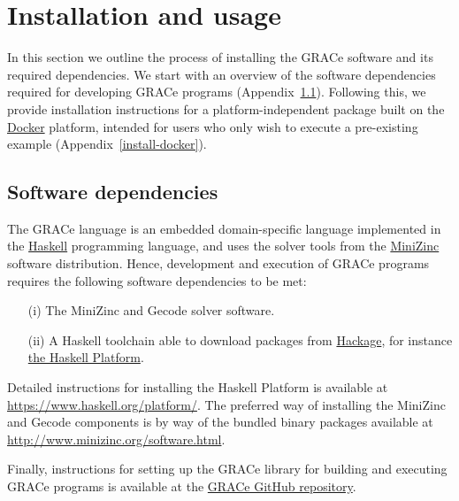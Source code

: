 
\section{Installation and usage}
\label{appendix-install}
%
In this section we outline the process of installing the GRACe software and its
required dependencies. We start with an overview of the software dependencies
required for developing GRACe programs (Appendix~\ref{install-overview}).
Following this, we provide installation instructions for a platform-independent
package built on the \href{https://www.docker.com/}{Docker} platform, intended
for users who only wish to execute a pre-existing example
(Appendix~\ref{install-docker}).


\subsection{Software dependencies}
\label{install-overview}
%
The GRACe language is an embedded domain-specific language implemented in the
\href{https://www.haskell.org/}{Haskell} programming language, and uses the
solver tools from the \href{http://www.minizinc.org/}{MiniZinc} software
distribution. Hence, development and execution of GRACe programs requires the
following software dependencies to be met:
%
\begin{itemize}
  \item[(i)] The MiniZinc and Gecode solver software.
  \item[(ii)] A Haskell toolchain able to download packages from
    \href{https://hackage.haskell.org/}{Hackage}, for instance
    \href{https://www.haskell.org/platform/}{the Haskell Platform}.
\end{itemize}

Detailed instructions for installing the Haskell Platform is available at
\url{https://www.haskell.org/platform/}. The preferred way of installing the
MiniZinc and Gecode components is by way of the bundled binary packages
available at \url{http://www.minizinc.org/software.html}.

Finally, instructions for setting up the GRACe library for building and
executing GRACe programs is available at the \href{https://github.com/GRACeFUL-%
project/GRACe/blob/master/Readme.md}{GRACe GitHub repository}.

